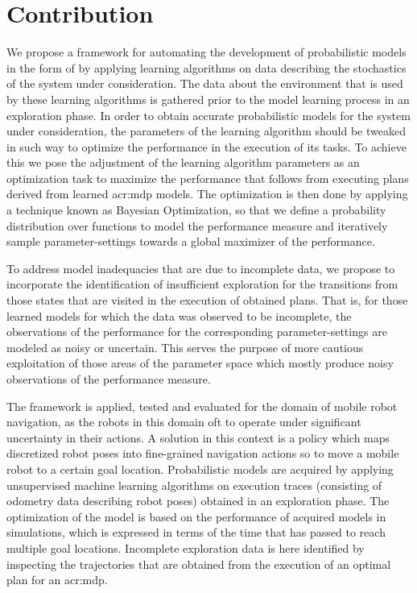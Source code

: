 \section{Contribution}
\label{sec:contribution}

We propose a framework for automating the development of probabilistic models in the form of  by applying learning algorithms on data describing the stochastics of the system under consideration.
The data about the environment that is used by these learning algorithms is gathered prior to the model learning process in an exploration phase.
In order to obtain accurate probabilistic models for the system under consideration, the parameters of the learning algorithm should be tweaked in such way to optimize the performance in the execution of its tasks.
To achieve this we pose the adjustment of the learning algorithm parameters as an optimization task to maximize the performance that follows from executing plans derived from learned \acrshort{acr:mdp} models.
The optimization is then done by applying a technique known as Bayesian Optimization, so that we define a probability distribution over functions to model the performance measure and iteratively sample parameter-settings towards a global maximizer of the performance.

To address model inadequacies that are due to incomplete data, we propose to incorporate the identification of insufficient exploration for the transitions from those states that are visited in the execution of obtained plans.
That is, for those learned models for which the data was observed to be incomplete, the observations of the performance for the corresponding parameter-settings are modeled as noisy or uncertain.
This serves the purpose of more cautious exploitation of those areas of the parameter space which mostly produce noisy observations of the performance measure.

The framework is applied, tested and evaluated for the domain of mobile robot navigation, as the robots in this domain oft to operate under significant uncertainty in their actions.
A solution in this context is a policy which maps discretized robot poses into fine-grained navigation actions so to move a mobile robot to a certain goal location.
Probabilistic models are acquired by applying unsupervised machine learning algorithms on execution traces (consisting of odometry data describing robot poses) obtained in an exploration phase.
The optimization of the model is based on the performance of acquired models in simulations, which is expressed in terms of the time that has passed to reach multiple goal locations.
Incomplete exploration data is here identified by inspecting the trajectories that are obtained from the execution of an optimal plan for an \acrshort{acr:mdp}.


